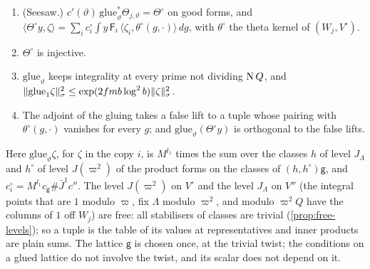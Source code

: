 \begin{theorem}[Gluing]\label{thm:gluing}
\begin{enumerate}[label=\textup{(\alph*)}]
\item (Seesaw.) $c'(\vartheta)\,\mathrm{glue}_\vartheta^*\Theta_{j,\vartheta}=\Theta^\circ$ on good forms, and $\langle\Theta^\circ y,\zeta\rangle=\sum_ic^\circ_i\int y\,\mathsf F_i\,\langle\zeta_i,\theta^\circ(g,\cdot)\rangle\,dg$, with $\theta^\circ$ the theta kernel of $(W_j,V^\circ)$.
\item $\Theta^\circ$ is injective.
\item $\mathrm{glue}_\vartheta$ keeps integrality at every prime not dividing $\operatorname{N} Q$, and $\lVert \mathrm{glue}_1\zeta\rVert_\sigma^2\le\exp(2fmb\log^2b)\lVert \zeta\rVert_\sigma^2$.
\item The adjoint of the gluing takes a false lift to a tuple whose pairing with $\theta^\circ(g,\cdot)$ vanishes for every $g$; and $\mathrm{glue}_\vartheta(\Theta^\circ y)$ is orthogonal to the false lifts.
\end{enumerate}
\end{theorem}

Here $\mathrm{glue}_\vartheta\zeta$, for $\zeta$ in the copy $i$, is $M^{l_1}$ times the sum over the classes $h$ of level $J_\Lambda$ and $h^\circ$ of level $J(\varpi^2)$ of the product forms on the classes of $(h,h^\circ)\mathsf g$, and $c^\circ_i=M^{l_1}c_{\mathsf g}\#\bar J^1c''$.
The level $J(\varpi^2)$ on $V^\circ$ and the level $J_\Lambda$ on $V''$ (the integral points that are $1$ modulo $\varpi$, fix $\Lambda$ modulo $\varpi^2$, and modulo $\varpi^2Q$ have the columns of $1$ off $W_j$) are free: all stabilisers of classes are trivial
(\cref{prop:free-levels}); so a tuple is the table of its values at representatives and inner products are plain sums. The lattice $\mathsf g$ is chosen once, at the trivial twist; the conditions on a glued lattice do not involve the twist, and its
scalar does not depend on it.


